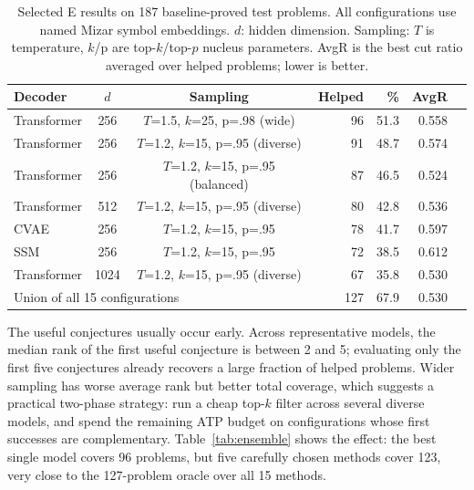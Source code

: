\documentclass{easychair}
\newcommand{\Eprover}{E\xspace}
\newcommand{\Mizar}{Mizar\xspace}
\begin{document}
\begin{table}[t]
\centering
\caption{Selected \Eprover results on 187 baseline-proved test
problems.  All configurations use named \Mizar symbol embeddings.
$d$: hidden dimension.  Sampling: $T$ is temperature, $k$/p are
top-$k$/top-$p$ nucleus parameters.  AvgR is the best cut ratio
averaged over helped problems; lower is better.}
\label{tab:e}
\small
\begin{tabular}{lccrrrr}
\toprule
Decoder & $d$ & Sampling & Helped & \% & AvgR \\
\midrule
Transformer & 256  & $T$=1.5, $k$=25, p=.98 (wide)    & 96 & 51.3 & 0.558 \\
Transformer & 256  & $T$=1.2, $k$=15, p=.95 (diverse)  & 91 & 48.7 & 0.574 \\
Transformer & 256  & $T$=1.2, $k$=15, p=.95 (balanced)  & 87 & 46.5 & 0.524 \\
Transformer & 512  & $T$=1.2, $k$=15, p=.95 (diverse)  & 80 & 42.8 & 0.536 \\
CVAE        & 256  & $T$=1.2, $k$=15, p=.95             & 78 & 41.7 & 0.597 \\
SSM         & 256  & $T$=1.2, $k$=15, p=.95             & 72 & 38.5 & 0.612 \\
Transformer & 1024 & $T$=1.2, $k$=15, p=.95 (diverse)  & 67 & 35.8 & 0.530 \\
\midrule
\multicolumn{3}{l}{Union of all 15 configurations} & 127 & 67.9 & 0.530 \\
\bottomrule
\end{tabular}
\end{table}

The useful conjectures usually occur early.  Across representative
models, the median rank of the first useful conjecture is between 2
and 5; evaluating only the first five conjectures already recovers a
large fraction of helped problems.  Wider sampling has worse average
rank but better total coverage, which suggests a practical two-phase
strategy: run a cheap top-$k$ filter across several diverse models, and
spend the remaining ATP budget on configurations whose first successes
are complementary.  Table~\ref{tab:ensemble} shows the effect: the best
single model covers 96 problems, but five carefully chosen methods
cover 123, very close to the 127-problem oracle over all 15 methods.
\end{document}

